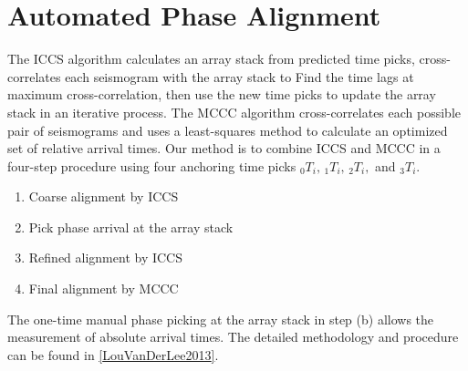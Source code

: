 \documentclass[letterpaper,10pt,english]{sphinxmanual}
\begin{document}
\section{Automated Phase Alignment}
\label{docfiles/PickingTravelTimes:automated-phase-alignment}
The ICCS algorithm calculates an array stack from predicted time picks, cross-correlates each seismogram with the array stack to Find the time lags at maximum cross-correlation, then use the new time picks to update the array stack in an iterative process. The MCCC algorithm cross-correlates each possible pair of seismograms and uses a least-squares method to calculate an optimized set of relative arrival times. Our method is to combine ICCS and MCCC in a four-step procedure using four anchoring time picks \(_0T_i,\,_1T_i,\,_2T_i,\) and \(_3T_i\).
\begin{enumerate}
\item {} 
Coarse alignment by ICCS

\item {} 
Pick phase arrival at the array stack

\item {} 
Refined alignment by ICCS

\item {} 
Final alignment by MCCC

\end{enumerate}

The one-time manual phase picking at the array stack in step (b) allows the measurement of absolute arrival times. The detailed methodology and procedure can be found in {\hyperref[docfiles/citations:louvanderlee2013]{{[}LouVanDerLee2013{]}}}.
\end{document}
